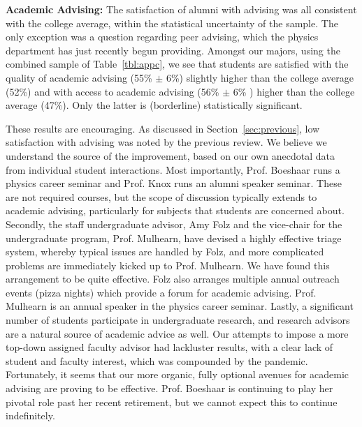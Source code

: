 \documentclass[12pt]{article}
\begin{document}
\noindent
{\bf Academic Advising:} The satisfaction of alumni with advising was
all consistent with the college average, within the statistical
uncertainty of the sample.  The only exception was a question
regarding peer advising, which the physics department has just
recently begun providing.  Amongst our majors, using the combined
sample of Table~\ref{tbl:appc}, we see that students are satisfied
with the quality of academic advising (55\% $\pm$ 6\%) slightly higher
than the college average (52\%) and with access to academic advising
(56\% $\pm$ 6\% ) higher than the college average (47\%).  Only the
latter is (borderline) statistically significant.

These results are encouraging.  As discussed in
Section~\ref{sec:previous}, low satisfaction with advising was noted
by the previous review.  We believe we understand the source of the
improvement, based on our own anecdotal data from individual student
interactions.  Most importantly, Prof. Boeshaar runs a physics career
seminar and Prof. Knox runs an alumni speaker seminar.  These are not
required courses, but the scope of discussion typically extends to
academic advising, particularly for subjects that students are
concerned about.  Secondly, the staff undergraduate advisor, Amy Folz
and the vice-chair for the undergraduate program, Prof. Mulhearn, have
devised a highly effective triage system, whereby typical issues are
handled by Folz, and more complicated problems are immediately kicked
up to Prof. Mulhearn.  We have found this arrangement to be quite
effective.  Folz also arranges multiple annual outreach events (pizza
nights) which provide a forum for academic advising.  Prof. Mulhearn
is an annual speaker in the physics career seminar.  Lastly, a
significant number of students participate in undergraduate research,
and research advisors are a natural source of academic advice as well.
Our attempts to impose a more top-down assigned faculty advisor had
lackluster results, with a clear lack of student and faculty interest,
which was compounded by the pandemic.  Fortunately, it seems that our
more organic, fully optional avenues for academic advising are proving
to be effective.  Prof. Boeshaar is continuing to play her pivotal
role past her recent retirement, but we cannot expect this to continue
indefinitely.\\[3pt]
\end{document}
